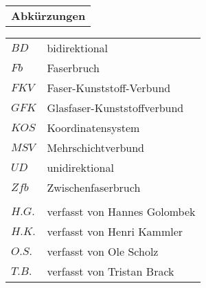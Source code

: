 \begin{longtable}[l]{l}
\onehalfspacing
\textbf{Abkürzungen}
\end{longtable}
\begin{longtable}[l]{ll}
\onehalfspacing
$ BD $& bidirektional\\
$Fb$&Faserbruch\\
$FKV$&Faser-Kunststoff-Verbund\\
$GFK$& Glasfaser-Kunststoffverbund\\
 $ KOS$& Koordinatensystem\\
$MSV$&Mehrschichtverbund\\
$UD$&unidirektional\\
$Zfb$&Zwischenfaserbruch\\
&\\
$H.G.$& verfasst von Hannes Golombek\\
$H.K.$& verfasst von Henri Kammler\\
$O.S.$& verfasst von Ole Scholz\\
$T.B.$& verfasst von Tristan Brack\\
\end{longtable}

